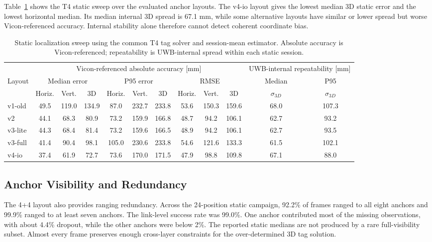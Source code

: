 \documentclass[journal,twoside,web]{ieeecolor}
\begin{document}
Table~\ref{tab:static_sweep} shows the T4 static sweep over the evaluated anchor layouts. The v4-io layout gives the lowest median 3D static error and the lowest horizontal median. Its median internal 3D spread is 67.1 mm, while some alternative layouts have similar or lower spread but worse Vicon-referenced accuracy. Internal stability alone therefore cannot detect coherent coordinate bias.

\begin{table}[!t]
\caption{Static localization sweep using the common T4 tag solver and session-mean estimator. Absolute accuracy is Vicon-referenced; repeatability is UWB-internal spread within each static session.}
\label{tab:static_sweep}
\centering
\scriptsize
\setlength{\tabcolsep}{3.2pt}
\begin{tabular}{lccccccccccc}
\hline
 & \multicolumn{9}{c}{Vicon-referenced absolute accuracy [mm]} & \multicolumn{2}{c}{UWB-internal repeatability [mm]}\\
Layout & \multicolumn{3}{c}{Median error} & \multicolumn{3}{c}{P95 error} & \multicolumn{3}{c}{RMSE} & Median & P95\\
 & Horiz. & Vert. & 3D & Horiz. & Vert. & 3D & Horiz. & Vert. & 3D & $\sigma_{3D}$ & $\sigma_{3D}$\\
\hline
v1-old & 49.5 & 119.0 & 134.9 & 87.0 & 232.7 & 233.8 & 53.6 & 150.3 & 159.6 & 68.0 & 107.3\\
v2 & 44.1 & 68.3 & 80.9 & 73.2 & 159.9 & 166.8 & 48.7 & 94.2 & 106.1 & 62.7 & 93.2\\
v3-lite & 44.3 & 68.4 & 81.4 & 73.2 & 159.6 & 166.5 & 48.9 & 94.2 & 106.1 & 62.7 & 93.5\\
v3-full & 41.4 & 90.4 & 98.1 & 105.0 & 230.6 & 233.8 & 54.6 & 121.6 & 133.3 & 61.5 & 102.1\\
v4-io & 37.4 & 61.9 & 72.7 & 73.6 & 170.0 & 171.5 & 47.9 & 98.8 & 109.8 & 67.1 & 88.0\\
\hline
\end{tabular}
\end{table}

\subsection{Anchor Visibility and Redundancy}
\label{sec:visibility}

The 4+4 layout also provides ranging redundancy. Across the 24-position static campaign, 92.2\% of frames ranged to all eight anchors and 99.9\% ranged to at least seven anchors. The link-level success rate was 99.0\%. One anchor contributed most of the missing observations, with about 4.4\% dropout, while the other anchors were below 2\%. The reported static medians are not produced by a rare full-visibility subset. Almost every frame preserves enough cross-layer constraints for the over-determined 3D tag solution.
\end{document}
